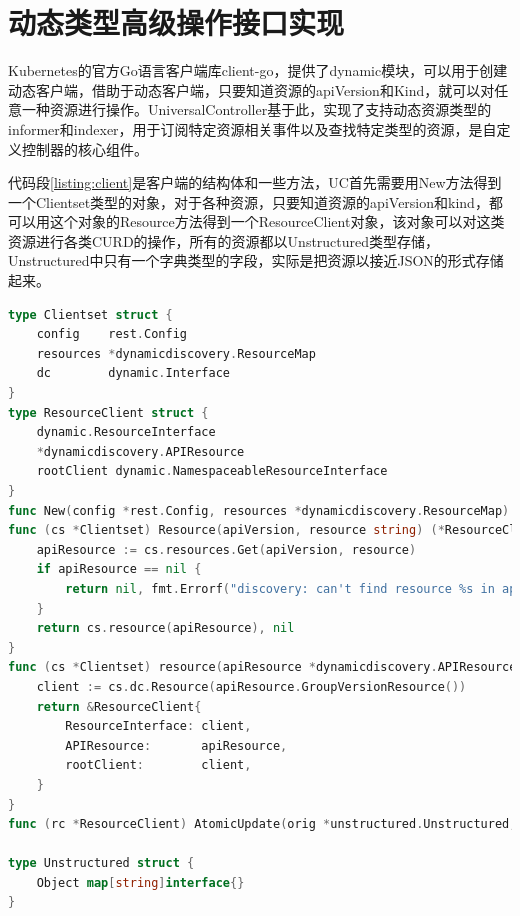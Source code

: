 \documentclass[macfonts,master]{njuthesis}
\begin{document}
\section{动态类型高级操作接口实现}

Kubernetes的官方Go语言客户端库client-go，提供了dynamic模块，可以用于创建动态客户端，借助于动态客户端，只要知道资源的apiVersion和Kind，就可以对任意一种资源进行操作。UniversalController基于此，实现了支持动态资源类型的informer和indexer，用于订阅特定资源相关事件以及查找特定类型的资源，是自定义控制器的核心组件。

代码段\ref{listing:client}是客户端的结构体和一些方法，UC首先需要用New方法得到一个Clientset类型的对象，对于各种资源，只要知道资源的apiVersion和kind，都可以用这个对象的Resource方法得到一个ResourceClient对象，该对象可以对这类资源进行各类CURD的操作，所有的资源都以Unstructured类型存储，Unstructured中只有一个字典类型的字段，实际是把资源以接近JSON的形式存储起来。

\newpage
\begin{lstlisting}[language=Go,caption=客户端实现,label=listing:client]
type Clientset struct {
	config    rest.Config
	resources *dynamicdiscovery.ResourceMap
	dc        dynamic.Interface
}
type ResourceClient struct {
	dynamic.ResourceInterface
	*dynamicdiscovery.APIResource
	rootClient dynamic.NamespaceableResourceInterface
}
func New(config *rest.Config, resources *dynamicdiscovery.ResourceMap) (*Clientset, error)
func (cs *Clientset) Resource(apiVersion, resource string) (*ResourceClient, error) {
	apiResource := cs.resources.Get(apiVersion, resource)
	if apiResource == nil {
		return nil, fmt.Errorf("discovery: can't find resource %s in apiVersion %s", resource, apiVersion)
	}
	return cs.resource(apiResource), nil
}
func (cs *Clientset) resource(apiResource *dynamicdiscovery.APIResource) *ResourceClient {
	client := cs.dc.Resource(apiResource.GroupVersionResource())
	return &ResourceClient{
		ResourceInterface: client,
		APIResource:       apiResource,
		rootClient:        client,
	}
}
func (rc *ResourceClient) AtomicUpdate(orig *unstructured.Unstructured, update func(obj *unstructured.Unstructured) bool) (result *unstructured.Unstructured, err error)

type Unstructured struct {
	Object map[string]interface{}
}
\end{lstlisting}
\end{document}
